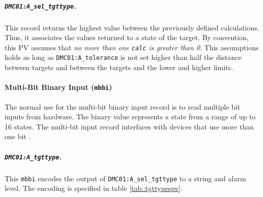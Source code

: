         \subparagraph{\texttt{DMC01:A\_sel\_tgttype}.}
            This record returns the highest value between the previously defined calculations.
            Thus, it associates the values returned to a state of the target.
            By convention, this PV assumes that \emph{no more than one \texttt{calc} is greater than 0}.
            This assumptions holds as long as \texttt{DMC01:A\_tolerance} is not set higher than half the distance between targets and between the targets and the lower and higher limits.

    \paragraph{Multi-Bit Binary Input (\texttt{mbbi})}
        The normal use for the multi-bit binary input record is to read multiple bit inputs from hardware.
        The binary value represents a state from a range of up to 16 states.
        The multi-bit input record interfaces with devices that use more than one bit \cite{stanley1998}.

        \subparagraph{\texttt{DMC01:A\_tgttype}.}
            This \texttt{mbbi} encodes the output of \texttt{DMC01:A\_sel\_tgttype} to a string and alarm level.
            The encoding is specified in table \ref{tab::tgttypespv}.

